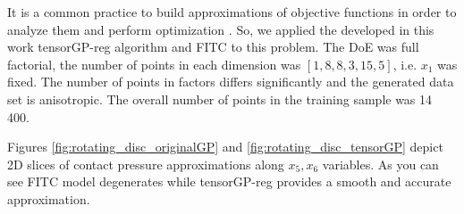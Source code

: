 It is a common practice to build approximations of objective functions in order to analyze them
and perform optimization \citep{forrester2008surrogateModelling}.
So, we applied the developed in this work tensorGP-reg algorithm and FITC to this problem.
The DoE was full factorial, the number of points in each dimension was $[1, 8, 8, 3, 15, 5]$, i.e.
$x_1$ was fixed.
The number of points in factors differs significantly and the generated data set is anisotropic.
The overall number of points in the training sample was 14 400.

Figures \ref{fig:rotating_disc_originalGP} and \ref{fig:rotating_disc_tensorGP} depict 2D slices of contact pressure
approximations along $x_5, x_6$ variables.
As you can see FITC model degenerates while tensorGP-reg provides a smooth and accurate approximation.

